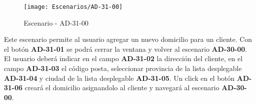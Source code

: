 \begin{figure}[H]
\centering
\texttt{[image: Escenarios/AD-31-00]}
\caption{Escenario - AD-31-00}
\label{fig:AD-31-00}
\end{figure}
Este escenario permite al usuario agregar un nuevo domicilio para un cliente.
Con el botón \textbf{AD-31-01} se podrá cerrar la ventana y volver al escenario \textbf{AD-30-00}.
El usuario deberá indicar en el campo \textbf{AD-31-02} la dirección del cliente, en el campo \textbf{AD-31-03} el código posta, seleccionar provincia de la lista desplegable \textbf{AD-31-04} y ciudad de la lista desplegable \textbf{AD-31-05}.
Un click en el botón \textbf{AD-31-06} creará el domicilio asignandolo al cliente y navegará al escenario \textbf{AD-30-00}.
\\